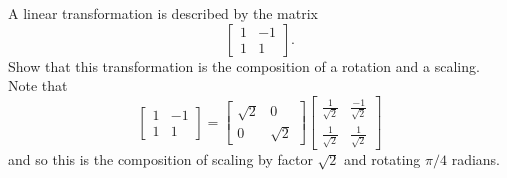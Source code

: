 A linear transformation is described by the matrix
\[
\begin{bmatrix} 1 & -1 \\ 1 & 1 \end{bmatrix}.
\]
Show that this transformation is the composition of a rotation and a scaling.
\newline
Note that
\[
\begin{bmatrix}
1 & -1\\
1 & 1
\end{bmatrix} = \begin{bmatrix} \sqrt{2} & 0\\
0 & \sqrt{2} \end{bmatrix}
\begin{bmatrix}
\frac{1}{\sqrt{2}} & \frac{-1}{\sqrt{2}}\\
\frac{1}{\sqrt{2}} & \frac{1}{\sqrt{2}}
\end{bmatrix}
\]
and so this is the composition of scaling by factor $\sqrt{2}$ and rotating $\pi/4$ radians.